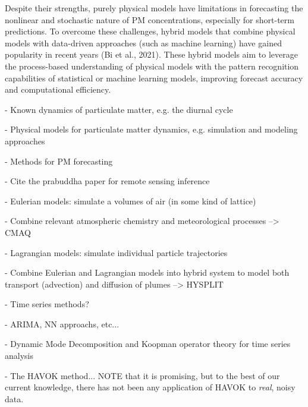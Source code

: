 Despite their strengths, purely physical models have limitations in forecasting
the nonlinear and stochastic nature of PM concentrations, especially for
short-term predictions. To overcome these challenges, hybrid models that combine
physical models with data-driven approaches (such as machine learning) have
gained popularity in recent years (Bi et al., 2021). These hybrid models aim to
leverage the process-based understanding of physical models with the pattern
recognition capabilities of statistical or machine learning models, improving
forecast accuracy and computational efficiency.




- Known dynamics of particulate matter, e.g. the diurnal cycle

- Physical models for particulate matter dynamics, e.g. simulation and modeling
approaches


- Methods for PM forecasting


- Cite the prabuddha paper for remote sensing inference

- Eulerian models: simulate a volumes of air (in some kind of lattice)

- Combine relevant atmospheric chemistry and meteorological processes --> CMAQ

- Lagrangian models: simulate individual particle trajectories

- Combine Eulerian and Lagrangian models into hybrid system to model both
transport (advection) and diffusion of plumes --> HYSPLIT

- Time series methods?

- ARIMA, NN approachs, etc...

- Dynamic Mode Decomposition and Koopman operator theory for time series analysis

- The HAVOK method... NOTE that it is promising, but to the best of our current
knowledge, there has not been any application of HAVOK to \textit{real}, noisy data.


